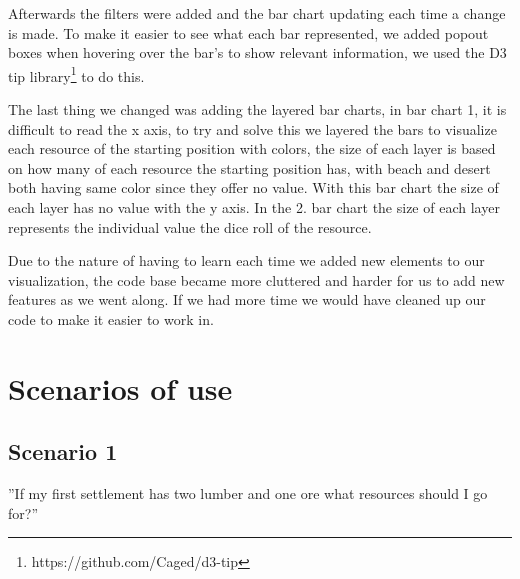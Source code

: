 \documentclass[journal]{vgtc}                %
\begin{document}
Afterwards the filters were added and the bar chart updating each time a change is made.
To make it easier to see what each bar represented, we added popout boxes when
hovering over the bar's to show relevant information, we used the D3 tip library\footnote{https://github.com/Caged/d3-tip}
to do this.

The last thing we changed was adding the layered bar charts,
in bar chart 1, it is difficult to read the x axis, to try and solve this we layered
the bars to visualize each resource of the starting position with colors,
the size of each layer is based on how many of each resource the starting position has,
with beach and desert both having same color since they offer no value. With this bar chart
the size of each layer has no value with the y axis. In the 2. bar chart the size of each
layer represents the individual value the dice roll of the resource.

Due to the nature of having to learn each time we added new elements to our visualization, the code base became more cluttered and harder for us to add new features as we went along. If we had more time we would have cleaned up our code to make it easier to work in.
\section{Scenarios of use}

\subsection{Scenario 1}

”If my first settlement has two lumber and one ore what resources should I go
for?”
\end{document}
